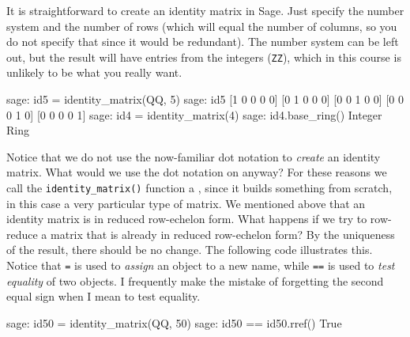 It is straightforward to create an identity matrix in Sage.  Just specify the number system and the number of rows (which will equal the number of columns, so you do not specify that since it would be redundant).  The number system can be left out, but the result will have entries from the integers (\verb?ZZ?), which in this course is unlikely to be what you really want.
%
\begin{sageexample}
sage: id5 = identity_matrix(QQ, 5)
sage: id5
[1 0 0 0 0]
[0 1 0 0 0]
[0 0 1 0 0]
[0 0 0 1 0]
[0 0 0 0 1]
sage: id4 = identity_matrix(4)
sage: id4.base_ring()
Integer Ring
\end{sageexample}
%
Notice that we do not use the now-familiar dot notation to \emph{create} an identity matrix.  What would we use the dot notation on anyway?  For these reasons we call the \verb?identity_matrix()? function a , since it builds something from scratch, in this case a very particular type of matrix.
%
We mentioned above that an identity matrix is in reduced row-echelon form.  What happens if we try to row-reduce a matrix that is already in reduced row-echelon form?  By the uniqueness of the result, there should be no change.  The following code illustrates this.  Notice that \verb?=? is used to \emph{assign} an object to a new name, while \verb?==? is used to \emph{test equality} of two objects.  I frequently make the mistake of forgetting the second equal sign when I mean to test equality.
%
\begin{sageexample}
sage: id50 = identity_matrix(QQ, 50)
sage: id50 == id50.rref()
True
\end{sageexample}
%
\begin{sageverbatim}
\end{sageverbatim}
%
